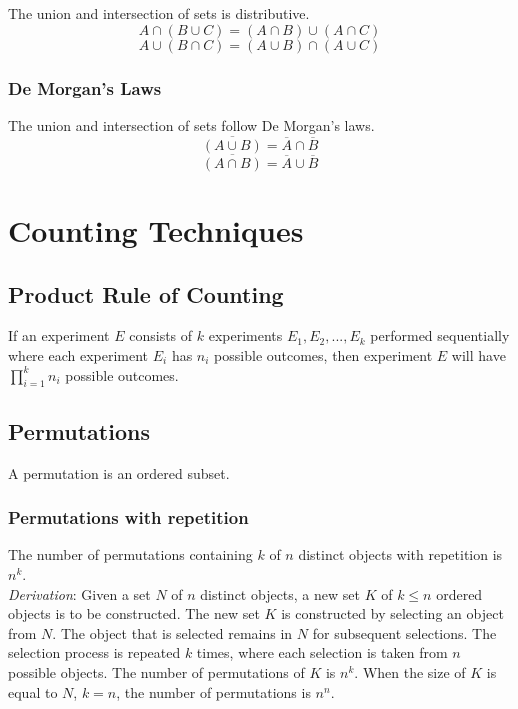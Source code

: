 \documentclass{article}
\begin{document}
The union and intersection of sets is distributive.
\[A \cap (B \cup C) = (A \cap B) \cup (A \cap C)\]
\[A \cup (B \cap C) = (A \cup B) \cap (A \cup C)\]

\subsubsection{De Morgan's Laws}

The union and intersection of sets follow De Morgan's laws.
\[\overline{(A \cup B)} = \overline{A} \cap \overline{B}\]
\[\overline{(A \cap B)} = \overline{A} \cup \overline{B}\]

\newpage
\section{Counting Techniques}

\subsection{Product Rule of Counting}

If an experiment $E$ consists of $k$ experiments $E_1, E_2,..., E_k$ performed sequentially where each experiment $E_i$ has $n_i$ possible outcomes, then experiment $E$ will have $\prod_{i=1}^k n_i$ possible outcomes.

\subsection{Permutations}

A permutation is an ordered subset.

\subsubsection{Permutations with repetition}

The number of permutations containing $k$ of $n$ distinct objects with repetition is $n^k$.\\
\textit{Derivation}: Given a set $N$ of $n$ distinct objects, a new set $K$ of $k \leq n$ ordered objects is to be constructed. The new set $K$ is constructed by selecting an object from $N$. The object that is selected remains in $N$ for subsequent selections. The selection process is repeated $k$ times, where each selection is taken from $n$ possible objects. The number of permutations of $K$ is $n^k$. When the size of $K$ is equal to $N$, $k=n$, the number of permutations is $n^n$.
\end{document}
